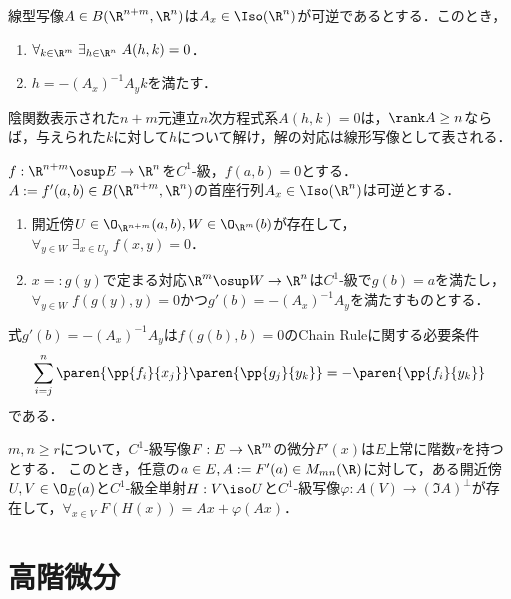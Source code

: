 \documentclass[uplatex, dvipdfmx]{jsreport}
\begin{document}
\begin{lemma}[$n$元連立方程式の解]
    線型写像$A\in B(\R^{n+m},\R^n)$は$A_x\in\Iso(\R^n)$が可逆であるとする．このとき，
    \begin{enumerate}
        \item $\forall_{k\in\R^m}\;\exists_{h\in\R^n}\;A(h,k)=0$．
        \item $h=-(A_x)^{-1}A_yk$を満たす．
    \end{enumerate}
\end{lemma}
\begin{remarks}
    陰関数表示された$n+m$元連立$n$次方程式系$A(h,k)=0$は，$\rank A\ge n$ならば，与えられた$k$に対して$h$について解け，解の対応は線形写像として表される．
\end{remarks}

\begin{theorem}[陰関数定理]
    $f:\R^{n+m}\osup E\to\R^n$を$C^1$-級，$f(a,b)=0$とする．$A:=f'(a,b)\in B(\R^{n+m},\R^n)$の首座行列$A_x\in\Iso(\R^n)$は可逆とする．
    \begin{enumerate}
        \item 開近傍$U\in\O_{\R^{n+m}}(a,b),W\in\O_{\R^m}(b)$が存在して，$\forall_{y\in W}\;\exists_{x\in U_y}\;f(x,y)=0$．
        \item $x=:g(y)$で定まる対応$\R^m\osup W\to\R^n$は$C^1$-級で$g(b)=a$を満たし，$\forall_{y\in W}\;f(g(y),y)=0$かつ$g'(b)=-(A_x)^{-1}A_y$を満たすものとする．
    \end{enumerate}
\end{theorem}
\begin{remarks}
    式$g'(b)=-(A_x)^{-1}A_y$は$f(g(b),b)=0$のChain Ruleに関する必要条件
    \[\sum^n_{i=j}\paren{\pp{f_i}{x_j}}\paren{\pp{g_j}{y_k}}=-\paren{\pp{f_i}{y_k}}\]
    である．
\end{remarks}

\begin{theorem}
    $m,n\ge r$について，$C^1$-級写像$F:E\to\R^m$の微分$F'(x)$は$E$上常に階数$r$を持つとする．
    このとき，任意の$a\in E,A:=F'(a)\in M_{mn}(\R)$に対して，ある開近傍$U,V\in\O_E(a)$と$C^1$-級全単射$H:V\iso U$と$C^1$-級写像$\varphi:A(V)\to(\Im A)^\perp$が存在して，$\forall_{x\in V}\;F(H(x))=Ax+\varphi(Ax)$．
\end{theorem}

\section{高階微分}
\end{document}
